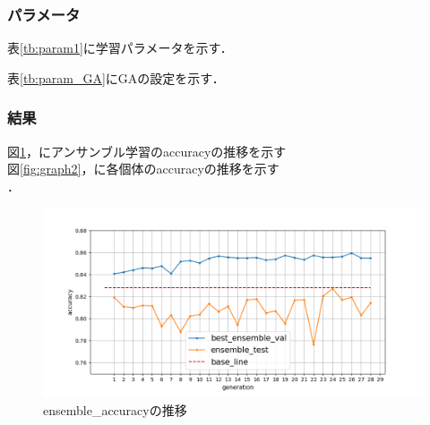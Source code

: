 \documentclass[twocolumn]{jarticle}     %
\begin{document}
\subsubsection{パラメータ}
表\ref{tb:param1}に学習パラメータを示す．
\begin{table}[h]
	\centering
	\caption{学習パラメータ\label{tb:param1}}
\end{table}
表\ref{tb:param_GA}にGAの設定を示す．
\begin{table}[h]
	\centering
	\caption{実験パラメータ\label{tb:param_GA}}
\end{table}
\subsubsection{結果}
図\ref{fig:graph}，にアンサンブル学習のaccuracyの推移を示す\\
図\ref{fig:graph2}，に各個体のaccuracyの推移を示す\\
．
\begin{figure}[b]
	\centering
	\includegraphics[scale=0.8]{graph.png}
	\caption{ensemble\_accuracyの推移\label{fig:graph}}
\end{figure}
\end{document}
